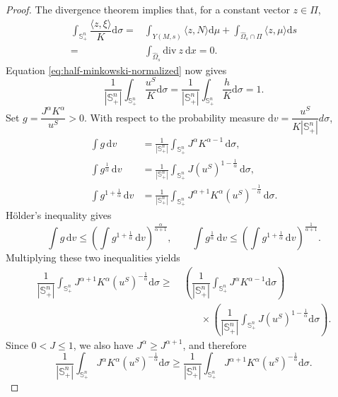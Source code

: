 \documentclass[11pt, reqno]{amsart}
\theoremstyle{remark}
\theoremstyle{definition}
\numberwithin{equation}{section}
\begin{document}
\begin{proof}
The divergence theorem implies that, for a constant vector $z\in\Pi$,
\begin{align*}
\int_{\mathbb{S}_+^n}\dfrac{\langle z,\xi \rangle}{K}\mathrm{d}\sigma=&\int_{Y(M,s)} \langle z,N \rangle\mathrm{d}\mu+\int_{\widehat{\Omega}_s\cap\Pi}\langle z,\mu \rangle \mathrm{d}s \\
=& \int_{\widehat{\Omega}_s}\mathrm{div}~z~\mathrm{d}x=0.
\end{align*}
Equation \eqref{eq:half-minkowski-normalized} now gives
\begin{equation*}
	\dfrac{1}{|\mathbb{S}_+^n|}\int_{\mathbb{S}_+^n} \frac{u^S}{K} \mathrm{d}\sigma
	=\dfrac{1}{|\mathbb{S}_+^n|}\int_{\mathbb{S}_+^n} \frac{h}{K}\mathrm{d}\sigma=1.
\end{equation*}
Set $g=\dfrac{J^\alpha K^\alpha}{u^S}>0$.  With respect to the probability measure $\mathrm{d}v=\dfrac{u^S}{K|\mathbb{S}^n_+|}d\sigma$,
\begin{align*}
        \int g\,\mathrm{d}v
        &=\frac{1}{|\mathbb S_+^n|}
          \int_{\mathbb S_+^n}J^\alpha K^{\alpha-1}\,\mathrm{d}\sigma,\\
        \int g^{\frac{1}{\alpha}}\,\mathrm{d}v
        &=\frac{1}{|\mathbb S_+^n|}
          \int_{\mathbb S_+^n}J (u^S)^{1-\frac{1}{\alpha}}\,\mathrm{d}\sigma,\\
        \int g^{1+\frac{1}{\alpha}}\,\mathrm{d}v
        &=\frac{1}{|\mathbb S_+^n|}
          \int_{\mathbb S_+^n}J^{\alpha+1}K^\alpha
          (u^{S})^{-\frac1\alpha}\,\mathrm{d}\sigma.
\end{align*}
H\"older's inequality gives
\begin{equation*}
        \int g\,\mathrm{d}v
        \leq \left(\int g^{1+\frac{1}{\alpha}}\,\mathrm{d}v \right)^{\frac{\alpha}{\alpha+1}},
        \qquad
        \int g^{\frac{1}{\alpha}}\,\mathrm{d}v
        \leq \left(\int g^{1+\frac{1}{\alpha}}\,\mathrm{d}v\right)^{\frac{1}{\alpha+1}}.
\end{equation*}
Multiplying these two inequalities yields
\begin{align}\label{equ-holder}
    \dfrac{1}{|\mathbb{S}_+^n|}\int_{\mathbb{S}_+^n} J^{\alpha+1}K^{\alpha}(u^S)^{-\frac{1}{\alpha}}\mathrm{d}\sigma \geq &~\left( \dfrac{1}{|\mathbb{S}_+^n|}\int_{\mathbb{S}_+^n} J^{\alpha}K^{\alpha-1}\mathrm{d}\sigma \right)\nonumber\\
    &\qquad \times \left( \dfrac{1}{|\mathbb{S}_+^n|}\int_{\mathbb{S}_+^n} J(u^S)^{1-\frac{1}{\alpha}}\mathrm{d}\sigma \right).    
\end{align}
Since $0 < J \leq 1$, we also have $J^\alpha \geq J^{\alpha+1}$, and therefore
\begin{equation}
    \dfrac{1}{|\mathbb{S}_+^n|}\int_{\mathbb{S}_+^n} J^{\alpha}K^{\alpha}(u^S)^{-\frac{1}{\alpha}}\mathrm{d}\sigma \geq \dfrac{1}{|\mathbb{S}_+^n|}\int_{\mathbb{S}_+^n} J^{\alpha+1}K^{\alpha}(u^S)^{-\frac{1}{\alpha}}\mathrm{d}\sigma.
    \label{equ-holder1}
\end{equation}



\end{proof}
\end{document}
